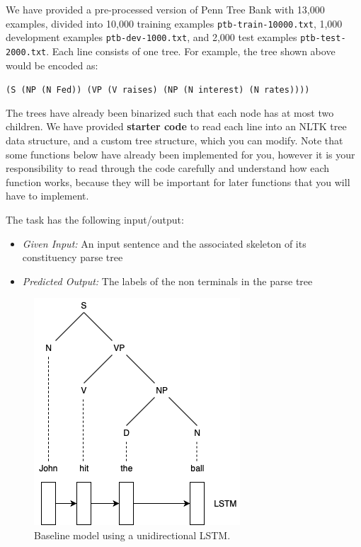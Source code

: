 \documentclass[11pt,addpoints,answers]{exam}
\numberwithin{equation}{section} %
\numberwithin{figure}{section} %
\numberwithin{table}{section} %
\begin{document}
\clearpage
{}

We have provided a pre-processed version of Penn Tree Bank with {\color{red}13,000} examples, divided into {\color{red}10,000 training examples \lstinline{ptb-train-10000.txt}, 1,000 development examples \lstinline{ptb-dev-1000.txt}, and 2,000 test examples \lstinline{ptb-test-2000.txt}}. Each line consists of one tree. For example, the tree shown above would be encoded as:

\noindent
\lstinline{(S (NP (N Fed)) (VP (V raises) (NP (N interest) (N rates))))}

The trees have already been binarized such that each node has at most two children.
%
We have provided \textbf{starter code} to read each line into an NLTK tree data structure, and a custom tree structure, which you can modify. Note that some functions below have already been implemented for you, however it is your responsibility to read through the code carefully and understand how each function works, because they will be important for later functions that you will have to implement.

The task has the following input/output:
\begin{itemize}
    \item \emph{Given Input:} An input sentence and the associated skeleton of its constituency parse tree
    \item \emph{Predicted Output:} The labels of the non terminals in the parse tree
\end{itemize}


\begin{figure}[h]
\centering
\includegraphics[width=0.3\linewidth]{fig/baseline.png}
\caption{Baseline model using a unidirectional LSTM.}
\label{learned_interp}
\end{figure}
\end{document}
